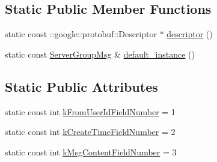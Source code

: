 \subsection*{Static Public Member Functions}
\begin{DoxyCompactItemize}
\item 
static const \+::google\+::protobuf\+::\+Descriptor $\ast$ \hyperlink{class_i_m_1_1_base_define_1_1_server_group_msg_a40c85934d7e1f2a26989bad68903f470}{descriptor} ()
\item 
static const \hyperlink{class_i_m_1_1_base_define_1_1_server_group_msg}{Server\+Group\+Msg} \& \hyperlink{class_i_m_1_1_base_define_1_1_server_group_msg_a41542eddf8b215265ff4acc6d18b27ab}{default\+\_\+instance} ()
\end{DoxyCompactItemize}
\subsection*{Static Public Attributes}
\begin{DoxyCompactItemize}
\item 
static const int \hyperlink{class_i_m_1_1_base_define_1_1_server_group_msg_a2e91d5aaad125df327a706df4c657e2c}{k\+From\+User\+Id\+Field\+Number} = 1
\item 
static const int \hyperlink{class_i_m_1_1_base_define_1_1_server_group_msg_aeede2e61d782f2c02502a26769cad8a6}{k\+Create\+Time\+Field\+Number} = 2
\item 
static const int \hyperlink{class_i_m_1_1_base_define_1_1_server_group_msg_a2d629baf7c304f6e5cf912cb2fc8c874}{k\+Msg\+Content\+Field\+Number} = 3
\end{DoxyCompactItemize}
